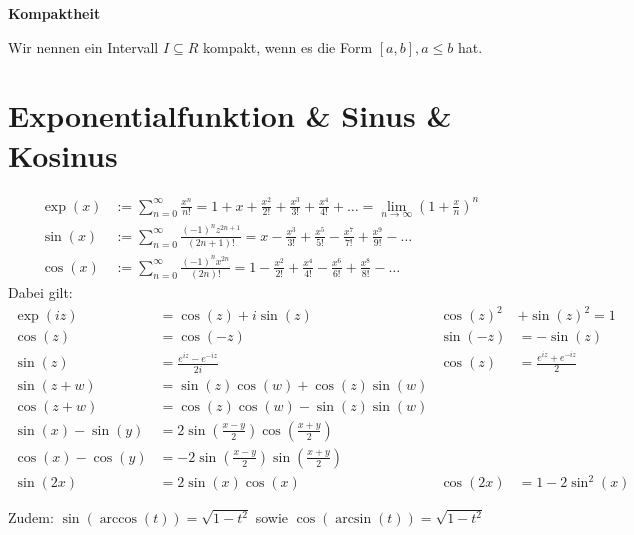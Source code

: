 \documentclass[25pt]{sciposter}
\newenvironment{method}[1]{\begin{mdframed}[backgroundcolor=blue!10,innertopmargin=15pt, innerbottommargin=15pt, nobreak=true]
		\textbf{#1 }
	}
	{ 
	\end{mdframed}
}
\begin{document}
\begin{multicols}{3}
\begin{method}{Kompaktheit}
	Wir nennen ein Intervall $I \subseteq R$ kompakt, wenn es die Form $[a,b], a \leq b$ hat.
\end{method}



\section*{Exponentialfunktion \& Sinus \& Kosinus}

\begin{align*}
	\operatorname{exp}(x) &:=\sum_{n=0}^{\infty} \frac{x^n}{n!} = 1 + x + \frac{x^2}{2!} + \frac{x^3}{3!} + \frac{x^4}{4!} +  \ldots = \lim_{n \to \infty} \left( 1 + \frac xn \right)^n\\
	\operatorname{sin}(x) &:=\sum_{n=0}^{\infty} \frac{(-1)^n z^{2n+1}}{(2n+1)!} = x - \frac{x^3}{3!}+ \frac{x^5}{5!} - \frac{x^7}{7!} +  \frac{x^9}{9!} - \ldots\\
	\operatorname{cos}(x) &:=\sum_{n=0}^{\infty} \frac{(-1)^n x^{2n}}{(2n)!} = 1 - \frac{x^2}{2!} + \frac{x^4}{4!} -\frac{x^6}{6!} + \frac{x^8}{8!} -\ldots 
\end{align*}
Dabei gilt:
\begin{align*}
\operatorname{exp}(iz) &= \cos (z) + i\sin(z) &  \cos(z) ^2 &+ \sin(z)^2 = 1\\
\cos(z) &= \cos(-z) & \sin (-z) &= - \sin(z) \\
\sin (z) &= \frac{e^{iz} - e^{-iz}}{2i} & \cos (z) &= \frac{e^{iz} + e^{-iz}}{2}\\
\sin(z+w) &= \sin(z) \cos(w) + \cos(z) \sin(w) \\
\cos(z + w) &= \cos(z) \cos(w) - \sin(z) \sin(w)\\
\sin(x) - \sin(y) &=  2 \sin \left(\frac{x-y}{2}\right) \cos \left(\frac{x+y}{2}\right)\\
\cos(x) - \cos(y) &= - 2 \sin \left(\frac{x-y}{2}\right) \sin \left(\frac{x+y}{2}\right)\\
\sin(2x) &= 2\sin(x)\cos(x) &  \cos(2x) &= 1 - 2\sin^2(x)
\end{align*}

Zudem: $\sin(\arccos(t)) = \sqrt{1 - t^2}$ sowie $\cos(\arcsin(t)) = \sqrt{1-t^2}$




\end{multicols}
\end{document}
